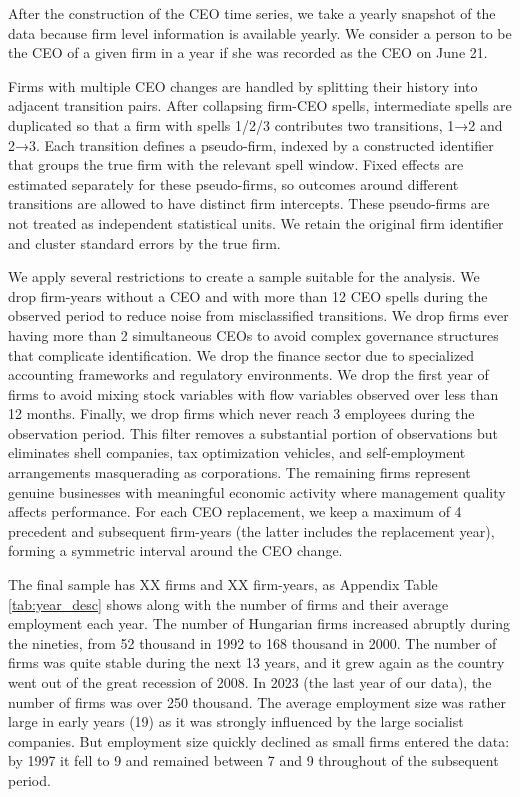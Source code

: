 \documentclass[11pt,a4paper]{article}
\begin{document}
After the construction of the CEO time series, we take a yearly snapshot of the data because firm level information is available yearly. We consider a person to be the CEO of a given firm in a year if she was recorded as the CEO on June 21.

Firms with multiple CEO changes are handled by splitting their history into adjacent transition pairs. After collapsing firm-CEO spells, intermediate spells are duplicated so that a firm with spells 1/2/3 contributes two transitions, 1→2 and 2→3. Each transition defines a pseudo-firm, indexed by a constructed identifier that groups the true firm with the relevant spell window. Fixed effects are estimated separately for these pseudo-firms, so outcomes around different transitions are allowed to have distinct firm intercepts. These pseudo-firms are not treated as independent statistical units. We retain the original firm identifier and cluster standard errors by the true firm. 

We apply several restrictions to create a sample suitable for the analysis. We drop firm-years without a CEO and with more than 12 CEO spells during the observed period to reduce noise from misclassified transitions. We drop firms ever having more than 2 simultaneous CEOs to avoid complex governance structures that complicate identification. We drop the finance sector due to specialized accounting frameworks and regulatory environments. We drop the first year of firms to avoid mixing stock variables with flow variables observed over less than 12 months. Finally, we drop firms which never reach 3 employees during the observation period. This filter removes a substantial portion of observations but eliminates shell companies, tax optimization vehicles, and self-employment arrangements masquerading as corporations. The remaining firms represent genuine businesses with meaningful economic activity where management quality affects performance. For each CEO replacement, we keep a maximum of 4 precedent and subsequent firm-years (the latter includes the replacement year), forming a symmetric interval around the CEO change.

The final sample has XX firms and XX firm-years, as Appendix Table \ref{tab:year_desc} shows along with the number of firms and their average employment each year. The number of Hungarian firms increased abruptly during the nineties, from 52 thousand in 1992 to 168 thousand in 2000. The number of firms was quite stable during the next 13 years, and it grew again as the country went out of the great recession of 2008. In 2023 (the last year of our data), the number of firms was over 250 thousand. The average employment size was rather large in early years (19) as it was strongly influenced by the large socialist companies. But employment size quickly declined as small firms entered the data: by 1997 it fell to 9 and remained between 7 and 9 throughout of the subsequent period.
\end{document}
